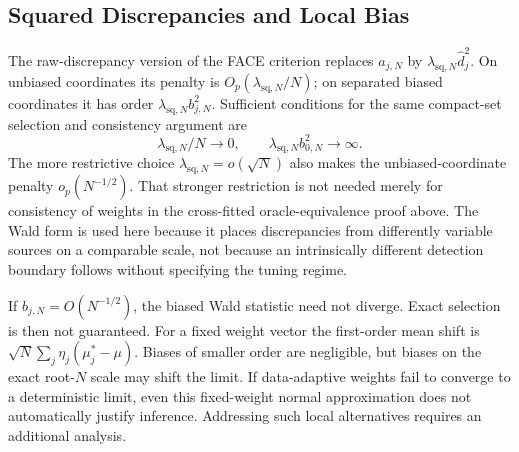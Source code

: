 \documentclass[12pt]{article}
\newcommand{\FACEHDEndDocument}{\end{document}}
\newcommand{\FACEHDEndDocument}{}
\begin{document}
\subsection{Squared Discrepancies and Local Bias}\label{supp:original_face_squared_objective}
The raw-discrepancy version of the FACE criterion \citep{han2025federated} replaces $a_{j,N}$ by $\lambda_{\mathrm{sq},N}\widehat d_j^2$. On unbiased coordinates its penalty is $O_p(\lambda_{\mathrm{sq},N}/N)$; on separated biased coordinates it has order $\lambda_{\mathrm{sq},N}b_{j,N}^2$. Sufficient conditions for the same compact-set selection and consistency argument are
\[
\lambda_{\mathrm{sq},N}/N\to0,
\qquad \lambda_{\mathrm{sq},N}b_{0,N}^2\to\infty.
\]
The more restrictive choice $\lambda_{\mathrm{sq},N}=o(\sqrt{N})$ also makes the unbiased-coordinate penalty $o_p(N^{-1/2})$. That stronger restriction is not needed merely for consistency of weights in the cross-fitted oracle-equivalence proof above. The Wald form is used here because it places discrepancies from differently variable sources on a comparable scale, not because an intrinsically different detection boundary follows without specifying the tuning regime.

If $b_{j,N}=O(N^{-1/2})$, the biased Wald statistic need not diverge. Exact selection is then not guaranteed. For a fixed weight vector the first-order mean shift is $\sqrt{N}\sum_j\eta_j(\mu_j^*-\mu)$. Biases of smaller order are negligible, but biases on the exact root-$N$ scale may shift the limit. If data-adaptive weights fail to converge to a deterministic limit, even this fixed-weight normal approximation does not automatically justify inference. Addressing such local alternatives requires an additional analysis.

\ifFACEHDSTANDALONE


\fi
\FACEHDEndDocument
\end{document}
